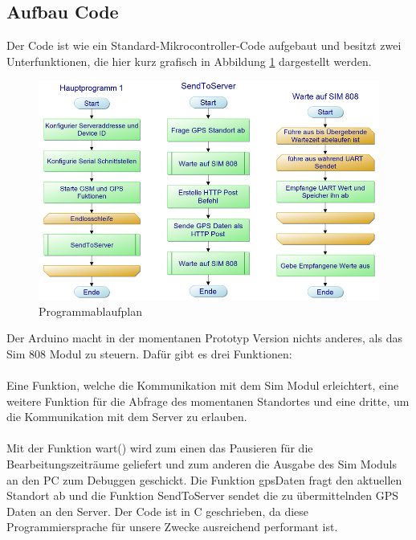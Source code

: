 \subsection{Aufbau Code}
Der Code ist wie ein Standard-Mikrocontroller-Code aufgebaut und besitzt zwei Unterfunktionen, die hier kurz grafisch in Abbildung \ref{PAP} dargestellt werden.
\begin{figure} [H]
	\begin{center}
		\includegraphics[width=1\textwidth]{Bilder/Arduino_Codeaufbau.png}
		\caption{Programmablaufplan}
		\label{PAP}
	\end{center}
\end{figure}
Der Arduino macht in der momentanen Prototyp Version nichts anderes, als das Sim 808 Modul zu steuern. Dafür gibt es drei Funktionen:
\\
\\
Eine Funktion, welche die Kommunikation mit dem Sim Modul erleichtert, eine weitere Funktion für die Abfrage des momentanen Standortes und eine dritte, um die Kommunikation mit dem Server zu erlauben. 
\\
\\
Mit der Funktion wart() wird zum einen das Pausieren für die Bearbeitungszeiträume geliefert und zum anderen die Ausgabe des Sim Moduls an den PC zum Debuggen geschickt. 
Die Funktion gpsDaten fragt den aktuellen Standort ab und die Funktion SendToServer sendet die zu übermittelnden GPS Daten an den Server.
Der Code ist in C geschrieben, da diese Programmiersprache für unsere Zwecke ausreichend performant ist.

